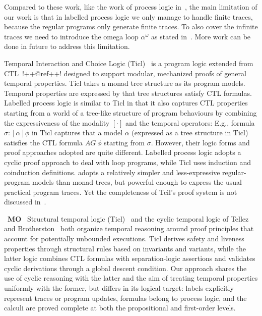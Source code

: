 \documentclass[manuscript,screen]{acmart}
\newcommand{\la}[0]{\langle}
\newcommand{\ra}[0]{\rangle}
\newcommand{\A}[1]{\mbox{ \textbf{#1} }}
\newcommand{\MO}{\A{MO}}
\begin{document}
\ifx
Compared to these work, like the work of process logic in~\cite{Harel82}, the main limitation of our work is that in labelled process logic we only manage to handle finite traces, because the regular programs only generate finite traces. To also cover the infinite traces we need to introduce the omega loop $\alpha^\omega$ as stated in~\cite{Harel00}. 
More work can be done in future to address this limitation. 
\fi

\ifx
Temporal Interaction and Choice Logic (Ticl)~\cite{Ticl25} is a program logic extended from CTL~\cite{???}!++@ref++! designed to support modular, mechanized proofs of general temporal properties. 
Ticl takes a monad tree structure as its program models. 
Temporal properties are expressed by that tree structures satisfy CTL formulas. 
Labelled process logic is similar to Ticl in that it also captures CTL properties starting from a world of a tree-like structure of program behaviours by combining the expressiveness of the modality $[\cdot]$ and the temporal operators: E.g., formula $\sigma : [\alpha]\phi$ in Ticl captures that a model $\alpha$ (expressed as a tree structure in Ticl) satisfies the CTL formula $\textit{AG}\ \phi$ starting from $\sigma$. 
However, their logic forms and proof approaches adopted are quite different. 
Labelled process logic adopts a cyclic proof approach to deal with loop programs, while Ticl uses induction and coinduction definitions. adopts a relatively simpler and less-expressive regular-program models than monad trees, but powerful enough to express the usual practical program traces.  
Yet the completeness of Tcil's proof system is not discussed in~\cite{Ticl25}. 



\MO
Structural temporal logic (Ticl)~\cite{Ticl25} and the cyclic temporal logic of Tellez and Brotherston~\cite{Gadi20} both organize temporal reasoning around proof principles that account for potentially unbounded executions.
Ticl derives safety and liveness properties through structural rules based on invariants and variants, while the latter logic combines CTL formulas with separation-logic assertions and validates cyclic derivations through a global descent condition.
Our approach shares the use of cyclic reasoning with the latter and the aim of treating temporal properties uniformly with the former, but differs in its logical target: labels explicitly represent traces or program updates, formulas belong to process logic, and the calculi are proved complete at both the propositional and first-order levels.
\end{document}
